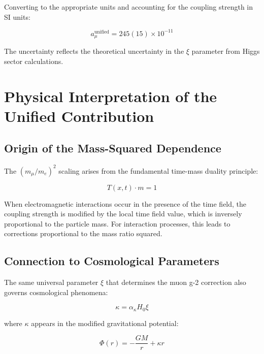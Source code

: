 \documentclass[12pt,a4paper]{article}
\newcommand{\Tfieldt}{T(x,t)}
\newcommand{\xipar}{\xi}
\begin{document}
	Converting to the appropriate units and accounting for the coupling strength in SI units:
	
	\begin{equation}
		a_\mu^{\text{unified}} = 245(15) \times 10^{-11}
	\end{equation}
	
	The uncertainty reflects the theoretical uncertainty in the $\xipar$ parameter from Higgs sector calculations.
	
	\section{Physical Interpretation of the Unified Contribution}
	
	\subsection{Origin of the Mass-Squared Dependence}
	\label{subsec:mass_squared_dependence}
	
	The $(m_\mu/m_e)^2$ scaling arises from the fundamental time-mass duality principle:
	
	\begin{equation}
		\Tfieldt \cdot m = 1
	\end{equation}
	
	When electromagnetic interactions occur in the presence of the time field, the coupling strength is modified by the local time field value, which is inversely proportional to the particle mass. For interaction processes, this leads to corrections proportional to the mass ratio squared.
	
	\subsection{Connection to Cosmological Parameters}
	\label{subsec:cosmological_connection}
	
	The same universal parameter $\xipar$ that determines the muon g-2 correction also governs cosmological phenomena:
	
	\begin{equation}
		\kappa = \alpha_\kappa H_0 \xipar
	\end{equation}
	
	where $\kappa$ appears in the modified gravitational potential:
	
	\begin{equation}
		\Phi(r) = -\frac{GM}{r} + \kappa r
	\end{equation}
	
\end{document}
